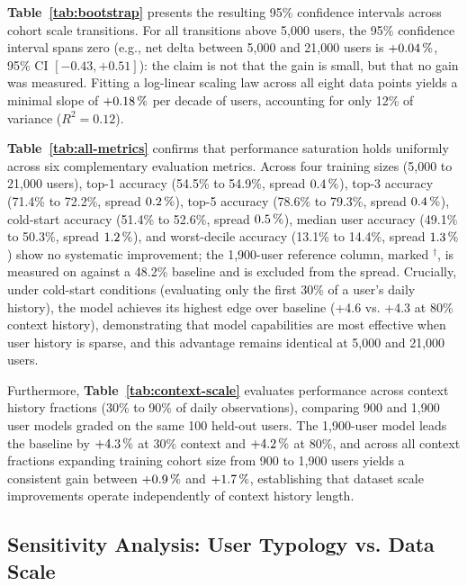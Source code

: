 \textbf{Table~\ref{tab:bootstrap}} presents the resulting 95\% confidence intervals across cohort scale transitions. For all transitions above 5,000 users, the 95\% confidence interval spans zero (e.g., net delta between 5,000 and 21,000 users is $+0.04\,\%$, 95\% CI $[-0.43, +0.51]$): the claim is not that the gain is small, but that no gain was measured. Fitting a log-linear scaling law across all eight data points yields a minimal slope of $+0.18\,\%$ per decade of users, accounting for only 12\% of variance ($R^2 = 0.12$).



\textbf{Table~\ref{tab:all-metrics}} confirms that performance saturation holds uniformly across six complementary evaluation metrics. Across four training sizes (5,000 to 21,000 users), top-1 accuracy (54.5\% to 54.9\%, spread $0.4\,\%$), top-3 accuracy (71.4\% to 72.2\%, spread $0.2\,\%$), top-5 accuracy (78.6\% to 79.3\%, spread $0.4\,\%$), cold-start accuracy (51.4\% to 52.6\%, spread $0.5\,\%$), median user accuracy (49.1\% to 50.3\%, spread $1.2\,\%$), and worst-decile accuracy (13.1\% to 14.4\%, spread $1.3\,\%$) show no systematic improvement; the 1,900-user reference column, marked $^{\dagger}$, is measured on \Dtwok{} against a 48.2\% baseline and is excluded from the spread. Crucially, under cold-start conditions (evaluating only the first 30\% of a user's daily history), the model achieves its highest edge over baseline (+4.6\pt{} vs. +4.3\pt{} at 80\% context history), demonstrating that model capabilities are most effective when user history is sparse, and this advantage remains identical at 5,000 and 21,000 users.



Furthermore, \textbf{Table~\ref{tab:context-scale}} evaluates performance across context history fractions (30\% to 90\% of daily observations), comparing 900 and 1,900 user models graded on the same 100 held-out users. The 1,900-user model leads the baseline by $+4.3\,\%$ at 30\% context and $+4.2\,\%$ at 80\%, and across all context fractions expanding training cohort size from 900 to 1,900 users yields a consistent gain between $+0.9\,\%$ and $+1.7\,\%$, establishing that dataset scale improvements operate independently of context history length.



\FloatBarrier

\subsection{Sensitivity Analysis: User Typology vs. Data Scale}

